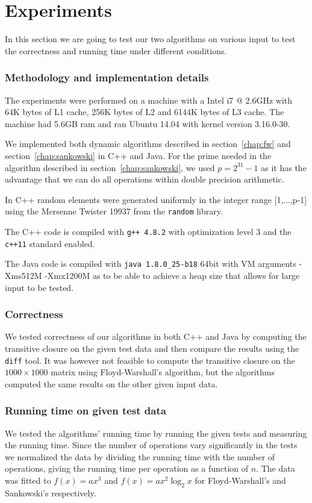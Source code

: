 \documentclass[a4paper,oneside,article,11pt]{memoir}
\begin{document}
\chapter{Experiments}
\label{chap:exp}
In this section we are going to test our two algorithms on various input to test the correctness and running time under different conditions.

\subsection{Methodology and implementation details}
The experiments were performed on a machine with a Intel i7 @ 2.6GHz with 64K bytes of L1 cache, 256K bytes of L2 and 6144K bytes of L3 cache. The machine had 5.6GB ram and ran Ubuntu 14.04 with kernel version 3.16.0-30.

We implemented both dynamic algorithms described in section~\ref{chap:fw} and section~\ref{chap:sankowski} in C++ and Java. For the prime needed in the algorithm described in section~\ref{chap:sankowski}, we used $p = 2^{31}-1$ as it has the advantage that we can do all operations within double precision arithmetic.

In C++ random elements were generated uniformly in the integer range [1,...,p-1] using the Mersenne Twister 19937 from the \texttt{random} library.

The C++ code is compiled with \texttt{g++ 4.8.2} with optimization level 3 and the \texttt{c++11} standard enabled.

The Java code is compiled with \texttt{java 1.8.0\_25-b18} 64bit with VM arguments -Xms512M -Xmx1200M as to be able to achieve a heap size that allows for large input to be tested.

\subsection{Correctness}
We tested correctness of our algorithms in both C++ and Java by computing the transitive closure on the given test data and then compare the results using the \texttt{diff} tool. It was however not feasible to compute the transitive closure on the $1000 \times 1000$ matrix using Floyd-Warshall's algorithm, but the algorithms computed the same results on the other given input data.

\subsection{Running time on given test data}
We tested the algorithms' running time by running the given tests and measuring the running time. Since the number of operations vary significantly in the tests we normalized the data by dividing the running time with the number of operations, giving the running time per operation as a function of $n$. The data was fitted to $f(x) = ax^3$ and $f(x)=ax^2\log_2 x$ for Floyd-Warshall's and Sankowski's respectively.
\end{document}
